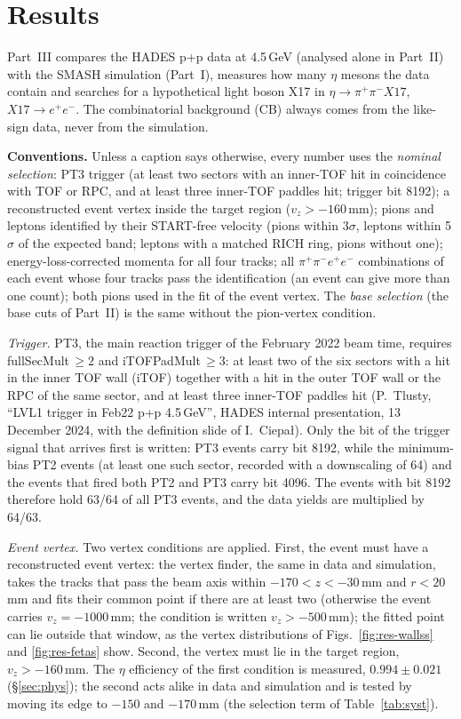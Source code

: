 \documentclass[11pt,a4paper]{article}
\newcommand{\ee}{\ensuremath{e^{+}e^{-}}\xspace}
\newcommand{\pipi}{\ensuremath{\pi^{+}\pi^{-}}\xspace}
\newcommand{\ppee}{\ensuremath{\pi^{+}\pi^{-}e^{+}e^{-}}\xspace}
\newcommand{\vz}{\ensuremath{v_z}\xspace}
\newcommand{\ptthree}{PT3 trigger (at least two sectors with an inner-TOF hit in coincidence with TOF or RPC, and at least three
inner-TOF paddles hit; trigger bit 8192)\xspace}
\newcommand{\selid}{pions and leptons identified by their START-free velocity (pions within 3$\sigma$, leptons within 5$\sigma$ of the
expected band; leptons with a matched RICH ring, pions without one); energy-loss-corrected momenta for all four tracks; all \ppee
combinations of each event whose four tracks pass the identification (an event can give more than one count)\xspace}
\newcommand{\selbase}{\ptthree; a reconstructed event vertex inside the target region ($\vz>-160$\,mm); \selid}
\newcommand{\selnom}{\selbase; both pions used in the fit of the event vertex\xspace}
\begin{document}
\section{Results}
\label{sec:res}
Part~III compares the HADES p+p data at 4.5\,GeV (analysed alone in Part~II) with the SMASH simulation (Part~I), measures how many $\eta$
mesons the data contain and searches for a hypothetical light boson X17 in $\eta\to\pipi X17$, $X17\to\ee$. The combinatorial background (CB)
always comes from the like-sign data, never from the simulation.

\textbf{Conventions.} Unless a caption says otherwise, every number uses the \emph{nominal selection}: \selnom. The \emph{base selection}
(the base cuts of Part~II) is the same without the pion-vertex condition.

\emph{Trigger.} PT3, the main reaction trigger of the February 2022 beam time, requires fullSecMult\,$\ge2$ and iTOFPadMult\,$\ge3$: at least
two of the six sectors with a hit in the inner TOF wall (iTOF) together with a hit in the outer TOF wall or the RPC of the same sector, and at
least three inner-TOF paddles hit (P.~Tlusty, ``LVL1 trigger in Feb22 p+p 4.5\,GeV'', HADES internal presentation, 13 December 2024, with
the definition slide of I.~Ciepa\l{}). Only the bit of the trigger signal that arrives first is written: PT3 events carry bit 8192, while the
minimum-bias PT2 events (at least one such sector, recorded with a downscaling of 64) and the events that fired both PT2 and PT3 carry bit
4096. The events with bit 8192 therefore hold 63/64 of all PT3 events, and the data yields are multiplied by 64/63.

\emph{Event vertex.} Two vertex conditions are applied. First, the event must have a reconstructed event vertex: the vertex finder, the same
in data and simulation, takes the tracks that pass the beam axis within $-170<z<-30$\,mm and $r<20$\,mm and fits their common point if there
are at least two (otherwise the event carries $\vz=-1000$\,mm; the condition is written $\vz>-500$\,mm); the fitted point can lie outside
that window, as the vertex distributions of Figs.~\ref{fig:res-wallss} and \ref{fig:res-fetas} show. Second, the vertex must lie in the
target region, $\vz>-160$\,mm. The $\eta$ efficiency of the first condition is measured, $0.994\pm0.021$ (\S\ref{sec:phys}); the second acts
alike in data and simulation and is tested by moving its edge to $-150$ and $-170$\,mm (the selection term of Table~\ref{tab:syst}).
\end{document}
